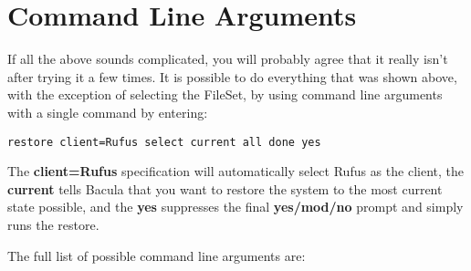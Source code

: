 \label{CommandArguments}

\section{Command Line Arguments}

If all the above sounds complicated, you will probably agree that it really
isn't after trying it a few times. It is possible to do everything that was
shown above, with the exception of selecting the FileSet, by using command
line arguments with a single command by entering: 

\footnotesize
\begin{verbatim}
restore client=Rufus select current all done yes
\end{verbatim}
\normalsize

The {\bf client=Rufus} specification will automatically select Rufus as the
client, the {\bf current} tells Bacula that you want to restore the system to
the most current state possible, and the {\bf yes} suppresses the final {\bf
yes/mod/no} prompt and simply runs the restore. 

The full list of possible command line arguments are: 

